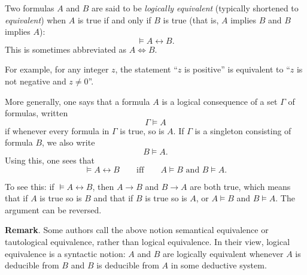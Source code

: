 \documentclass[12pt]{article}
\begin{document}
Two formulas $A$ and $B$ are said to be \emph{logically equivalent} (typically shortened to \emph{equivalent}) when $A$ is true if and only if $B$ is true (that is, $A$ implies $B$ and $B$ implies $A$):
$$\models A\leftrightarrow B.$$
This is sometimes abbreviated as $A \Leftrightarrow B$.

For example, for any integer $z$, the statement ``$z$ is positive'' is equivalent to ``$z$ is not negative and $z\neq 0$''.

More generally, one says that a formula $A$ is a logical consequence of a set $\Gamma$ of formulas, written $$\Gamma \models A$$
if whenever every formula in $\Gamma$ is true, so is $A$.  If $\Gamma$ is a singleton consisting of formula $B$, we also write $$B\models A.$$
Using this, one sees that $$\models A\leftrightarrow B\qquad \mbox{iff} \qquad A\models B\mbox{ and } B\models A.$$

To see this: if $\models A\leftrightarrow B$, then $A\to B$ and $B\to A$ are both true, which means that if $A$ is true so is $B$ and that if $B$ is true so is $A$, or $A\models B$ and $B\models A$.  The argument can be reversed.

\textbf{Remark}.  Some authors call the above notion semantical equivalence or tautological equivalence, rather than logical equivalence.  In their view, logical equivalence is a syntactic notion: $A$ and $B$ are logically equivalent whenever $A$ is deducible from $B$ and $B$ is deducible from $A$ in some deductive system.
\end{document}
